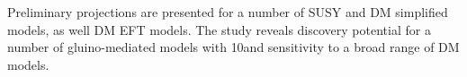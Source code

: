 Preliminary projections are presented for a number of SUSY and DM
simplified models, as well DM EFT models. The study reveals discovery
potential for a number of gluino-mediated models with 10\fbinv and
sensitivity to a broad range of DM models.



